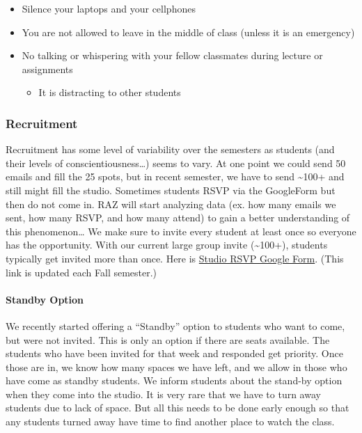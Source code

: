 \documentclass[
]{article}
\providecommand{\tightlist}{%
  \setlength{\itemsep}{0pt}\setlength{\parskip}{0pt}}
\begin{document}
\begin{itemize}
\begin{itemize}
    \begin{itemize}
    \tightlist
    \item
      Silence your laptops and your cellphones
    \item
      You are not allowed to leave in the middle of class (unless it is an emergency)
    \item
      No talking or whispering with your fellow classmates during lecture or assignments

      \begin{itemize}
      \tightlist
      \item
        It is distracting to other students
      \end{itemize}
    \end{itemize}
  \end{itemize}
\end{itemize}

\hypertarget{recruitment}{%
\subsubsection{Recruitment}\label{recruitment}}

Recruitment has some level of variability over the semesters as students (and their levels of conscientiousness\ldots) seems to vary. At one point we could send 50 emails and fill the 25 spots, but in recent semester, we have to send \textasciitilde100+ and still might fill the studio. Sometimes students RSVP via the GoogleForm but then do not come in. RAZ will start analyzing data (ex. how many emails we sent, how many RSVP, and how many attend) to gain a better understanding of this phenomenon\ldots{} We make sure to invite every student at least once so everyone has the opportunity. With our current large group invite (\textasciitilde100+), students typically get invited more than once. Here is \href{https://docs.google.com/forms/d/e/1FAIpQLSf78IM5OYt4hCd3_si7c0RAzMm8IVTHrM-3eibe-eiXvmFmGQ/viewform}{Studio RSVP Google Form}. (This link is updated each Fall semester.)

\hypertarget{standby-option}{%
\paragraph{Standby Option}\label{standby-option}}

We recently started offering a ``Standby'' option to students who want to come, but were not invited. This is only an option if there are seats available. The students who have been invited for that week and responded get priority. Once those are in, we know how many spaces we have left, and we allow in those who have come as standby students. We inform students about the stand-by option when they come into the studio. It is very rare that we have to turn away students due to lack of space. But all this needs to be done early enough so that any students turned away have time to find another place to watch the class.
\end{document}
